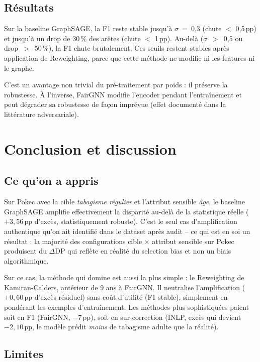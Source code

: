 \documentclass[10pt,a4paper,twocolumn]{article}
\begin{document}
\subsection{Résultats}

Sur la baseline GraphSAGE, la F1 reste stable jusqu'à $\sigma$~=~0{,}3 (chute $<$ 0{,}5\,pp) et jusqu'à un drop de 30\,\% des arêtes (chute $<$ 1\,pp). Au-delà ($\sigma$~$>$~0{,}5 ou drop~$>$~50\,\%), la F1 chute brutalement. Ces seuils restent stables après application de Reweighting, parce que cette méthode ne modifie ni les features ni le graphe.

C'est un avantage non trivial du pré-traitement par poids : il préserve la robustesse. À l'inverse, FairGNN modifie l'encoder pendant l'entraînement et peut dégrader sa robustesse de façon imprévue (effet documenté dans la littérature adversariale).

\section{Conclusion et discussion}

\subsection{Ce qu'on a appris}

Sur Pokec avec la cible \emph{tabagisme régulier} et l'attribut sensible \emph{âge}, le baseline GraphSAGE amplifie effectivement la disparité au-delà de la statistique réelle ($+3{,}56$\,pp d'excès, statistiquement robuste). C'est le seul cas d'amplification authentique qu'on ait identifié dans le dataset après audit -- ce qui est en soi un résultat : la majorité des configurations cible $\times$ attribut sensible sur Pokec produisent du $\Delta$DP qui reflète en réalité du selection bias et non un biais algorithmique.

Sur ce cas, la méthode qui domine est aussi la plus simple : le Reweighting de Kamiran-Calders, antérieur de 9 ans à FairGNN. Il neutralise l'amplification ($+0{,}60$\,pp d'excès résiduel) sans coût d'utilité (F1 stable), simplement en pondérant les exemples d'entraînement. Les méthodes plus sophistiquées paient soit en F1 (FairGNN, $-7$\,pp), soit en sur-correction (INLP, excès qui devient $-2{,}10$\,pp, le modèle prédit \emph{moins} de tabagisme adulte que la réalité).

\subsection{Limites}
\end{document}
